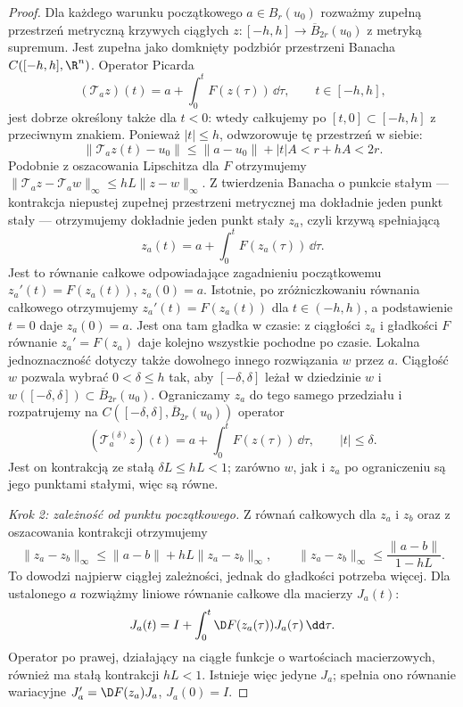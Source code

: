 \begin{proof}
Dla każdego warunku początkowego $a\in B_r(u_0)$ rozważmy
zupełną przestrzeń metryczną krzywych ciągłych
$z\colon[-h,h]\to\overline B_{2r}(u_0)$ z metryką supremum.
Jest zupełna jako domknięty podzbiór przestrzeni Banacha
$C([-h,h],\R^n)$.
Operator Picarda
\[
 (\mathcal T_a z)(t)=a+\int_0^t F(z(\tau))\,\dd\tau,
 \qquad t\in[-h,h],
\]
jest dobrze określony także dla $t<0$: wtedy całkujemy po
$[t,0]\subset[-h,h]$ z przeciwnym znakiem. Ponieważ $|t|\leq h$,
odwzorowuje tę przestrzeń w siebie:
\[
 \|\mathcal T_a z(t)-u_0\|
 \leq\|a-u_0\|+|t|A<r+hA<2r.
\]
Podobnie z oszacowania Lipschitza dla $F$ otrzymujemy
$\|\mathcal T_a z-\mathcal T_a w\|_\infty
 \leq hL\|z-w\|_\infty$.
Z twierdzenia Banacha o punkcie stałym --- kontrakcja niepustej
zupełnej przestrzeni metrycznej ma dokładnie jeden punkt stały ---
otrzymujemy dokładnie jeden punkt stały $z_a$, czyli krzywą spełniającą
\[
 z_a(t)=a+\int_0^t F(z_a(\tau))\,\dd\tau.
\]
Jest to równanie całkowe odpowiadające zagadnieniu początkowemu
$z_a'(t)=F(z_a(t))$, $z_a(0)=a$. Istotnie, po zróżniczkowaniu
równania całkowego otrzymujemy $z_a'(t)=F(z_a(t))$ dla
$t\in(-h,h)$, a podstawienie $t=0$ daje $z_a(0)=a$.
Jest ona tam gładka w czasie: z ciągłości $z_a$ i gładkości $F$
równanie $z_a'=F(z_a)$ daje kolejno wszystkie pochodne po czasie.
Lokalna jednoznaczność dotyczy także dowolnego innego rozwiązania
$w$ przez $a$. Ciągłość $w$ pozwala wybrać $0<\delta\leq h$ tak,
aby $[-\delta,\delta]$ leżał w dziedzinie $w$ i
$w([-\delta,\delta])\subset\overline B_{2r}(u_0)$.
Ograniczamy $z_a$ do tego samego przedziału i rozpatrujemy na
$C([-\delta,\delta],\overline B_{2r}(u_0))$ operator
\[
 (\mathcal T_a^{(\delta)}z)(t)
 =a+\int_0^t F(z(\tau))\,\dd\tau,\qquad |t|\leq\delta.
\]
Jest on kontrakcją ze stałą $\delta L\leq hL<1$; zarówno $w$,
jak i $z_a$ po ograniczeniu są jego punktami stałymi, więc są równe.

\emph{Krok 2: zależność od punktu początkowego.}
Z równań całkowych dla $z_a$ i $z_b$ oraz z oszacowania
kontrakcji otrzymujemy
\[
 \|z_a-z_b\|_\infty
 \leq \|a-b\|+hL\|z_a-z_b\|_\infty,
 \qquad
 \|z_a-z_b\|_\infty\leq\frac{\|a-b\|}{1-hL}.
\]
To dowodzi najpierw ciągłej zależności, jednak do gładkości
potrzeba więcej. Dla ustalonego $a$ rozwiążmy liniowe
równanie całkowe dla macierzy $J_a(t)$:
\[
 J_a(t)=I+\int_0^t\D F(z_a(\tau))J_a(\tau)\,\dd\tau.
\]
Operator po prawej, działający na ciągłe funkcje o wartościach
macierzowych, również ma stałą kontrakcji $hL<1$.
Istnieje więc jedyne $J_a$; spełnia ono równanie
wariacyjne $J_a'=\D F(z_a)J_a$, $J_a(0)=I$.


\end{proof}
